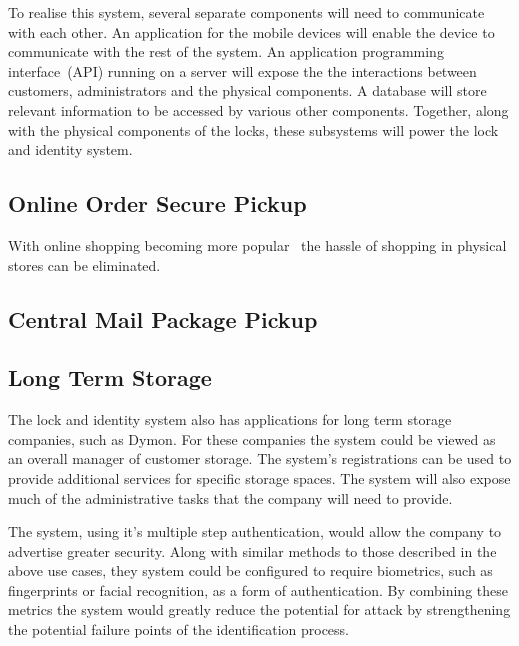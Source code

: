 \documentclass{article}
\begin{document}

To realise this system, several separate components will need to communicate with each other. An application for the
mobile devices will enable the device to communicate with the rest of the system. An application programming
interface~(API) running on a server will expose the the interactions between customers, administrators and the
physical components. A database will store relevant information to be accessed by various other components. Together,
along with the physical components of the locks, these subsystems will power the lock and identity system.



\subsection{Online Order Secure Pickup}

With online shopping becoming more popular~\autocite{CUSTORA} the hassle of shopping in physical stores can be
eliminated.

\subsection{Central Mail Package Pickup}

\lipsum[1]

\subsection{Long Term Storage}

The lock and identity system also has applications for long term storage companies, such as Dymon. For these companies
the system could be viewed as an overall manager of customer storage. The system's registrations can be used to provide
additional services for specific storage spaces. The system will also expose much of the administrative tasks that the
company will need to provide.

The system, using it's multiple step authentication, would allow the company to advertise greater security. Along with
similar methods to those described in the above use cases, they system could be configured to require biometrics, such
as fingerprints or facial recognition, as a form of authentication. By combining these metrics the system would greatly
reduce the potential for attack by strengthening the potential failure points of the identification process.
\end{document}
